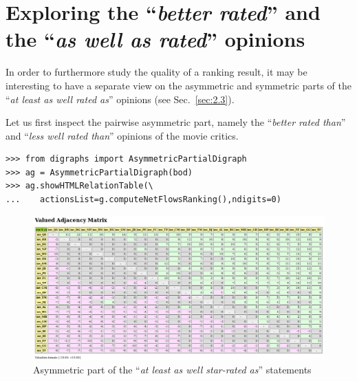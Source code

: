 \section{Exploring the ``\emph{better rated}''  and the ``\emph{as well as rated}'' opinions}
\label{sec:16.6}

In order to furthermore study the quality of a ranking result, it may be interesting to have a separate view on the asymmetric and symmetric parts of the ``\emph{at least as well rated as}'' opinions (see Sec.~\ref{sec:2.3}).

Let us first inspect the pairwise asymmetric part, namely the ``\emph{better rated than}'' and ``\emph{less well rated than}'' opinions of the movie critics. 
\begin{lstlisting}
>>> from digraphs import AsymmetricPartialDigraph
>>> ag = AsymmetricPartialDigraph(bod)
>>> ag.showHTMLRelationTable(\
...    actionsList=g.computeNetFlowsRanking(),ndigits=0)
\end{lstlisting}
\begin{figure}[ht]
\includegraphics[width=\hsize]{Figures/16-5-asymmetricPart.png}
\caption{Asymmetric part of the ``\emph{at least as well star-rated as}'' statements}
\label{fig:16.5}       %
\end{figure}

